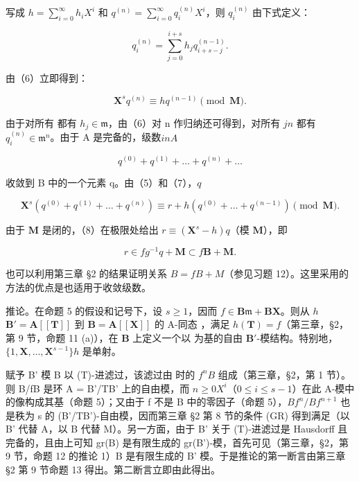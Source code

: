 写成 \(h = \sum_{i=0}^{\infty} h_i X^i\) 和 \(q^{(n)} = \sum_{i=0}^{\infty} q_i^{(n)} X^i\)，则 \(q_i^{(n)}\) 由下式定义：

\[
q _ {i} ^ {(n)} = \sum_ {j = 0} ^ {i + s} h _ {j} q _ {i + s - j} ^ {(n - 1)}.\tag{6}
\]

由（6）立即得到：

\[
\mathbf {X} ^ {s} q ^ {(n)} \equiv h q ^ {(n - 1)} \pmod {\mathbf {M}}.\tag{7}
\]

由于对所有  都有 \(h_j \in \mathfrak{m}\)，由（6）对 n 作归纳还可得到，对所有 \(j\)\(n\) 都有 \(q_i^{(n)} \in \mathfrak{m}^n\)。由于 A 是完备的，级数\(i\)\(n\)\(A\)

\[
q ^ {(0)} + q ^ {(1)} + \dots + q ^ {(n)} + \dots
\]

收敛到 B 中的一个元素 q。由（5）和（7），\(q\)

\[
\mathbf {X} ^ {s} (q ^ {(0)} + q ^ {(1)} + \dots + q ^ {(n)}) \equiv r + h (q ^ {(0)} + \dots + q ^ {(n - 1)}) \pmod {\mathbf {M}}. \tag {8}
\]

由于 \(\mathbf{M}\) 是闭的，（8）在极限处给出 \(r \equiv (\mathbf{X}^s - h)q\)（模 \(\mathbf{M}\)），即

\[
r \in f g ^ {- 1} q + \mathbf {M} \subset f \mathbf {B} + \mathbf {M}.
\]

也可以利用第三章 §2 的结果证明关系 \(B = fB + M\)（参见习题 12）。这里采用的方法的优点是也适用于收敛级数。

推论。在命题 5 的假设和记号下，设 \(s \geqslant 1\)，因而 \(f \in \mathbf{B}\mathfrak{m} + \mathbf{B}\mathbf{X}\)。则从 \(h\)\(\mathbf{B}' = \mathbf{A}[[\mathbf{T}]]\) 到 \(\mathbf{B} = \mathbf{A}[[\mathbf{X}]]\) 的 A-同态 ，满足 \(h(\mathbf{T}) = f\)（第三章，§2，第 9 节，命题 11 (a)），在 \(\mathbf{B}\) 上定义一个以  为基的自由 \(\mathbf{B}'\)-模结构。特别地，\(\{1, \mathbf{X}, \ldots, \mathbf{X}^{s-1}\}\)\(h\) 是单射。

赋予 B' 模 B 以 (T)-进滤过，该滤过由  时的 \(f^{n}B\) 组成（第三章，§2，第 1 节）。则 B/fB 是环 A = B'/TB' 上的自由模，而 \(n \geqslant 0\)\(X^{i}\)（\(0 \leqslant i \leqslant s - 1\)）在此 A-模中的像构成其基（命题 5）；又由于 f 不是 B 中的零因子（命题 5），\(Bf^{n}/Bf^{n+1}\) 也是秩为 s 的 (B'/TB')-自由模，因而第三章 §2 第 8 节的条件 (GR) 得到满足（以 B' 代替 A，以 B 代替 M）。另一方面，由于 B' 关于 (T)-进滤过是 Hausdorff 且完备的，且由上可知 gr(B) 是有限生成的 gr(B')-模，首先可见（第三章，§2，第 9 节，命题 12 的推论 1）B 是有限生成的 B' 模。于是推论的第一断言由第三章 §2 第 9 节命题 13 得出。第二断言立即由此得出。

